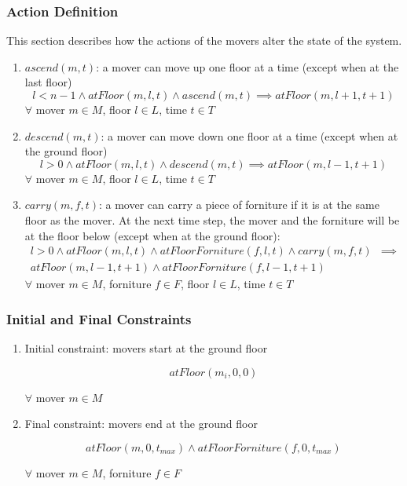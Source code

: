 \documentclass[a4paper, 11pt]{article}
\begin{document}
\subsubsection{Action Definition}

This section describes how the actions of the movers alter the state of the system.

\begin{enumerate}
	\item $ascend(m, t)$: a mover can move up one floor at a time (except when at the last floor)
	      $$
		      l < n -1 \land atFloor(m, l, t) \land ascend(m, t) \implies atFloor(m, l+1, t+1)
	      $$
	      $\forall$ mover $m \in M$, floor $l \in L$, time $t \in T$

	\item $descend(m, t)$: a mover can move down one floor at a time (except when at the ground floor)
	      $$
		      l > 0 \land atFloor(m, l, t) \land descend(m, t) \implies atFloor(m, l-1, t+1)
	      $$
	      $\forall$ mover $m \in M$, floor $l \in L$, time $t \in T$

	\item $carry(m, f, t)$: a mover can carry a piece of forniture if it is at the same floor as the mover. At the next time step, the mover and the forniture will be at the floor below (except when at the ground floor):
	      \begin{align*}
		      l > 0 \land atFloor(m, l, t) \land atFloorForniture(f, l, t) \land carry(m, f , t) & \implies \\
		      atFloor(m, l-1, t+1) \land atFloorForniture(f, l-1, t+1)
	      \end{align*}
	      $\forall$ mover $m \in M$, forniture $f \in F$, floor $l \in L$, time $t \in T$

\end{enumerate}


\subsubsection{Initial and Final Constraints}

\begin{enumerate}
	\item Initial constraint: movers start at the ground floor

	      $$atFloor(m_i, 0, 0)$$

	      $\forall$ mover $m \in M$

	\item Final constraint: movers end at the ground floor

	      $$atFloor(m, 0, t_{max}) \land atFloorForniture(f, 0, t_{max})$$

	      $\forall$ mover $m \in M$, forniture $f \in F$



\end{enumerate}
\end{document}
